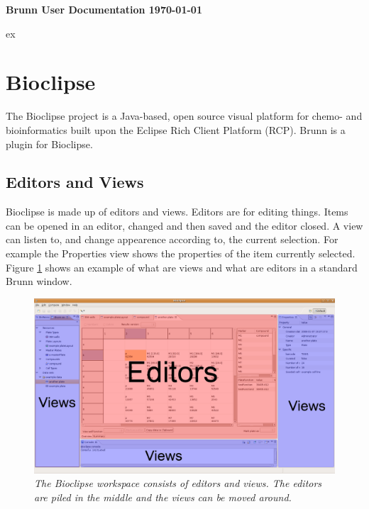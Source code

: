 \documentclass[a4paper,10pt]{article}
\begin{document}
    \huge 
    \noindent
    \begin{center}
        \textbf{Brunn User Documentation \newline
                \Large\today}
    \end{center}

     ex
    \normalsize
    \tableofcontents
    \newpage
    \section{Bioclipse}
        The Bioclipse project is a Java-based, open source visual platform for
        chemo- and bioinformatics built upon the Eclipse Rich Client Platform
        (RCP). Brunn is a plugin for Bioclipse.

        \subsection{Editors and Views}
            Bioclipse is made up of editors and views. Editors are for editing
            things. Items can be opened in an editor, changed and then saved and
            the editor closed. A view can listen to, and change appearence
            according to, the current selection. For example the Properties view
            shows the properties of the item currently selected. Figure
            \ref{editorsAndViews} shows an example of what are views and what
            are editors in a standard Brunn window.
            
            \begin{figure}[htbp]
                \begin{center}
                    \includegraphics[width=1\textwidth]{images/EditorsViews.png}
                \end{center}
                \caption{\textit{The Bioclipse workspace consists of editors
                                 and views. The editors are piled in the
                                 middle and the views can be moved around.}}
                \label{editorsAndViews}
            \end{figure}
\end{document}

